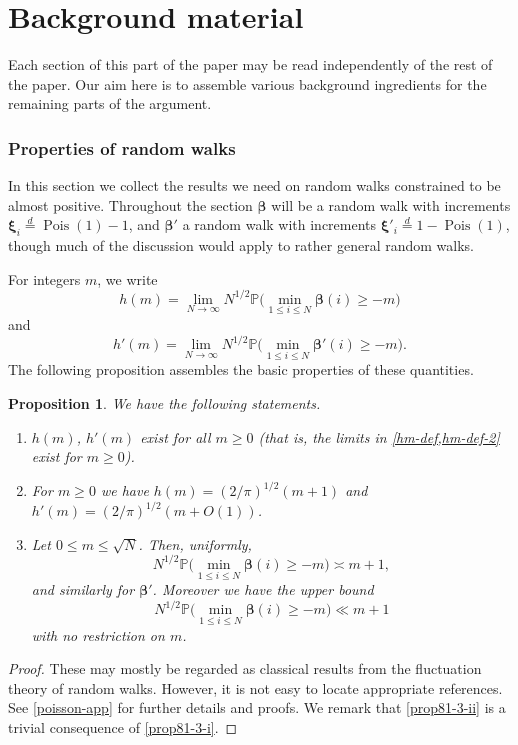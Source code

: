 \documentclass[11pt,reqno]{amsart}
\numberwithin{equation}{section}
\newtheorem{proposition}[theorem]{Proposition}
\theoremstyle{definition}
\theoremstyle{remark}
\newcommand{\mb}{\mathbb}
\newcommand\Pois{\operatorname{Pois}}
\def\boldbeta{\boldsymbol\beta}
\def\boldxi{\boldsymbol\xi}
\renewcommand{\le}{\leqslant}
\renewcommand{\ge}{\geqslant}
\newcommand\samedist{\overset{d}{=}}
\begin{document}
\part{Background material}\label{part2}

Each section of this part of the paper may be read independently of the rest of the paper. Our aim here is to assemble various background ingredients for the remaining parts of the argument. 

\section{Properties of random walks}\label{random-walk-sec}


In this section we collect the results we need on random walks constrained to be almost positive. Throughout the section $\boldbeta$ will be a random walk with increments $\boldxi_i \samedist \Pois(1) - 1$, and $\boldbeta'$ a random walk with increments $\boldxi'_i \samedist 1 - \Pois(1)$, though much of the discussion would apply to rather general random walks. 

For integers $m$, we write
\begin{equation}\label{hm-def}  h(m) = \lim_{N \rightarrow \infty} N^{1/2} \mb{P} \big(\min_{1 \le i \le N} \boldbeta(i) \ge -m\big)\end{equation} 
and
\begin{equation}\label{hm-def-2}  h'(m) = \lim_{N \rightarrow \infty} N^{1/2} \mb{P} \big(\min_{1 \le i \le N} \boldbeta'(i) \ge -m\big).\end{equation} The following proposition assembles the basic properties of these quantities.

\begin{proposition}\label{first-rand-walk-pos}
We have the following statements.
\begin{enumerate}
\item $h(m)$, $h'(m)$ exist for all $m \ge 0$ \textup{(}that is, the limits in \cref{hm-def,hm-def-2} exist for $m \ge 0$\textup{)}.
\item For $m \ge 0$ we have $h(m) = (2/\pi)^{1/2} (m + 1)$ and $h'(m) = (2/\pi)^{1/2} (m + O(1))$.
\item Let $0\le m \le \sqrt{N}$. Then, uniformly,
\begin{equation}\label{prop81-3-i} N^{1/2} \mb{P}\big(\min_{1 \le i \le N} \boldbeta(i) \ge - m\big) \asymp m + 1,\end{equation} and similarly for $\boldbeta'$. Moreover we have the upper bound
\begin{equation}\label{prop81-3-ii} N^{1/2} \mb{P}\big(\min_{1 \le i \le N} \boldbeta(i) \ge - m\big) \ll m + 1\end{equation}
with no restriction on $m$.
\end{enumerate}
\end{proposition}
\begin{proof} These may mostly be regarded as classical results from the fluctuation theory of random walks. However, it is not easy to locate appropriate references. See \cref{poisson-app} for further details and proofs. We remark that \cref{prop81-3-ii} is a trivial consequence of \cref{prop81-3-i}.
\end{proof}
\end{document}
